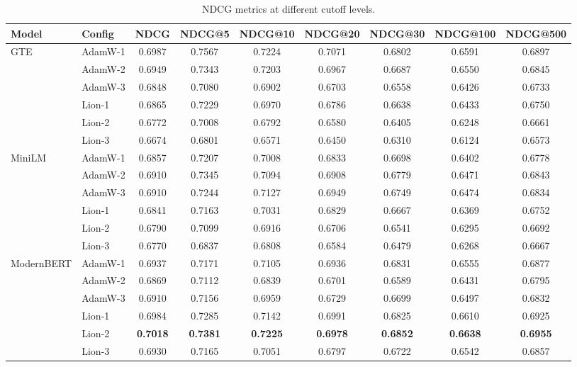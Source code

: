 \documentclass[conference]{IEEEtran}
\begin{document}
\begin{table}[t]
\centering
\caption{NDCG metrics at different cutoff levels.}
\label{tab:ndcg_metrics}
\small
\begin{tabular}{llccccccc}
\toprule
\textbf{Model} & \textbf{Config} & \textbf{NDCG} & \textbf{NDCG@5} & \textbf{NDCG@10} & \textbf{NDCG@20} & \textbf{NDCG@30} & \textbf{NDCG@100} & \textbf{NDCG@500} \\
\midrule
\multirow{6}{*}{GTE} & AdamW-1 & 0.6987 & 0.7567 & 0.7224 & 0.7071 & 0.6802 & 0.6591 & 0.6897 \\
 & AdamW-2 & 0.6949 & 0.7343 & 0.7203 & 0.6967 & 0.6687 & 0.6550 & 0.6845 \\
 & AdamW-3 & 0.6848 & 0.7080 & 0.6902 & 0.6703 & 0.6558 & 0.6426 & 0.6733 \\
 & Lion-1 & 0.6865 & 0.7229 & 0.6970 & 0.6786 & 0.6638 & 0.6433 & 0.6750 \\
 & Lion-2 & 0.6772 & 0.7008 & 0.6792 & 0.6580 & 0.6405 & 0.6248 & 0.6661 \\
 & Lion-3 & 0.6674 & 0.6801 & 0.6571 & 0.6450 & 0.6310 & 0.6124 & 0.6573 \\
\midrule
\multirow{6}{*}{MiniLM} & AdamW-1 & 0.6857 & 0.7207 & 0.7008 & 0.6833 & 0.6698 & 0.6402 & 0.6778 \\
 & AdamW-2 & 0.6910 & 0.7345 & 0.7094 & 0.6908 & 0.6779 & 0.6471 & 0.6843 \\
 & AdamW-3 & 0.6910 & 0.7244 & 0.7127 & 0.6949 & 0.6749 & 0.6474 & 0.6834 \\
 & Lion-1 & 0.6841 & 0.7163 & 0.7031 & 0.6829 & 0.6667 & 0.6369 & 0.6752 \\
 & Lion-2 & 0.6790 & 0.7099 & 0.6916 & 0.6706 & 0.6541 & 0.6295 & 0.6692 \\
 & Lion-3 & 0.6770 & 0.6837 & 0.6808 & 0.6584 & 0.6479 & 0.6268 & 0.6667 \\
\midrule
\multirow{6}{*}{ModernBERT} & AdamW-1 & 0.6937 & 0.7171 & 0.7105 & 0.6936 & 0.6831 & 0.6555 & 0.6877 \\
 & AdamW-2 & 0.6869 & 0.7112 & 0.6839 & 0.6701 & 0.6589 & 0.6431 & 0.6795 \\
 & AdamW-3 & 0.6910 & 0.7156 & 0.6959 & 0.6729 & 0.6699 & 0.6497 & 0.6832 \\
 & Lion-1 & 0.6984 & 0.7285 & 0.7142 & 0.6991 & 0.6825 & 0.6610 & 0.6925 \\
 & Lion-2 & \textbf{0.7018} & \textbf{0.7381} & \textbf{0.7225} & \textbf{0.6978} & \textbf{0.6852} & \textbf{0.6638} & \textbf{0.6955} \\
 & Lion-3 & 0.6930 & 0.7165 & 0.7051 & 0.6797 & 0.6722 & 0.6542 & 0.6857 \\
\bottomrule
\end{tabular}
\end{table}
\end{document}
